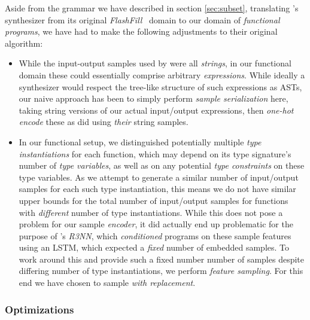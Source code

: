 \documentclass{article}
\begin{document}
Aside from the grammar we have described in section \ref{sec:subset},
translating \citet{nsps}'s synthesizer from its original \emph{FlashFill}~\citep{prose} domain to our domain of \emph{functional programs},
we have had to make the following adjustments to their original algorithm:
\begin{itemize}
    \item While the input-output samples used by \citet{nsps} were all \emph{strings},
    in our functional domain these could essentially comprise arbitrary \emph{expressions}.
    While ideally a synthesizer would respect the tree-like structure of such expressions as ASTs,
    our naive approach has been to simply perform \emph{sample serialization} here,
    taking string versions of our actual input/output expressions,
    then \emph{one-hot encode} these as \citet{nsps} did using \emph{their} string samples.
    \item In our functional setup,
    we distinguished potentially multiple \emph{type instantiations} for each function,
    which may depend on its type signature's number of \emph{type variables},
    as well as on any potential \emph{type constraints} on these type variables.
    As we attempt to generate a similar number of input/output samples for each such type instantiation,
    this means we do not have similar upper bounds for the total number of input/output samples for functions with \emph{different} number of type instantiations.
    While this does not pose a problem for our sample \emph{encoder},
    it did actually end up problematic for the purpose of \citet{nsps}'s \emph{R3NN},
    which \emph{conditioned} programs on these sample features using an LSTM,
    which expected a \emph{fixed} number of embedded samples.
    To work around this and provide such a fixed number number of samples despite differing number of type instantiations,
    we perform \emph{feature sampling}.
    For this end we have chosen to sample \emph{with replacement}.
\end{itemize}

\subsubsection{Optimizations}
\end{document}
